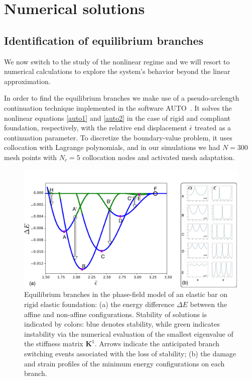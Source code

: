 
\section{Numerical solutions}
\label{sec:numerics}
\subsection{Identification of equilibrium branches}

We now switch to the study of  the nonlinear regime  and we will resort to numerical calculations  to explore the system's behavior beyond the linear approximation.

In order to find the equilibrium branches we make use of a pseudo-arclength continuation technique implemented in the software AUTO~\cite{Doedel1981-sa}. It solves the nonlinear equations \ref{auto1} and \ref{auto2} in the case of rigid and compliant foundation, respectively, with the relative end displacement $\bar\epsilon$ treated as a continuation parameter. To discretize the boundary-value problem, it uses collocation with Lagrange polynomials, and in our simulations we had $N=300$ mesh points with $N_c = 5$ collocation nodes and activated mesh adaptation. 
\begin{figure}
\includegraphics[scale=0.1]{./final_images/fig2.pdf}
    \caption{
Equilibrium branches in the phase-field model of an elastic bar on rigid elastic foundation: (a) the energy difference $\Delta E$ between the affine and non-affine configurations. Stability of solutions is indicated by colors: blue denotes stability, while green indicates instability   via the numerical evaluation of the smallest eigenvalue of the stiffness matrix $\mathbf{K}^1$. Arrows indicate the anticipated branch switching events associated with the loss of stability; (b) the damage and strain profiles of the minimum energy configurations on each branch.}
    \label{fig:enter-label}
\end{figure}
